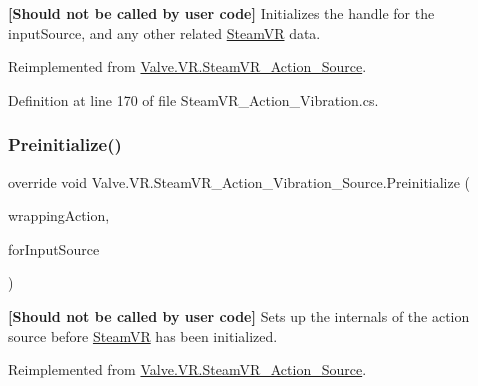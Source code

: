 {\bfseries{\mbox{[}Should not be called by user code\mbox{]}}} Initializes the handle for the input\+Source, and any other related \mbox{\hyperlink{class_valve_1_1_v_r_1_1_steam_v_r}{Steam\+VR}} data. 



Reimplemented from \mbox{\hyperlink{class_valve_1_1_v_r_1_1_steam_v_r___action___source_aa4784c092cc0a4372812834bfcceab6d}{Valve.\+V\+R.\+Steam\+V\+R\+\_\+\+Action\+\_\+\+Source}}.



Definition at line 170 of file Steam\+V\+R\+\_\+\+Action\+\_\+\+Vibration.\+cs.

\mbox{\label{class_valve_1_1_v_r_1_1_steam_v_r___action___vibration___source_a4fcbc01468b2bfd6be93ef24f6ae1aa3}} 
\subsubsection{\texorpdfstring{Preinitialize()}{Preinitialize()}}
{\footnotesize\ttfamily override void Valve.\+V\+R.\+Steam\+V\+R\+\_\+\+Action\+\_\+\+Vibration\+\_\+\+Source.\+Preinitialize (\begin{DoxyParamCaption}\item[{\mbox{\hyperlink{class_valve_1_1_v_r_1_1_steam_v_r___action}{Steam\+V\+R\+\_\+\+Action}}}]{wrapping\+Action,  }\item[{\mbox{\hyperlink{namespace_valve_1_1_v_r_a82e5bf501cc3aa155444ee3f0662853f}{Steam\+V\+R\+\_\+\+Input\+\_\+\+Sources}}}]{for\+Input\+Source }\end{DoxyParamCaption})\hspace{0.3cm}{\ttfamily [virtual]}}



{\bfseries{\mbox{[}Should not be called by user code\mbox{]}}} Sets up the internals of the action source before \mbox{\hyperlink{class_valve_1_1_v_r_1_1_steam_v_r}{Steam\+VR}} has been initialized. 



Reimplemented from \mbox{\hyperlink{class_valve_1_1_v_r_1_1_steam_v_r___action___source_aa2bec7f32b37595de01f1456a3fa5bfe}{Valve.\+V\+R.\+Steam\+V\+R\+\_\+\+Action\+\_\+\+Source}}.



